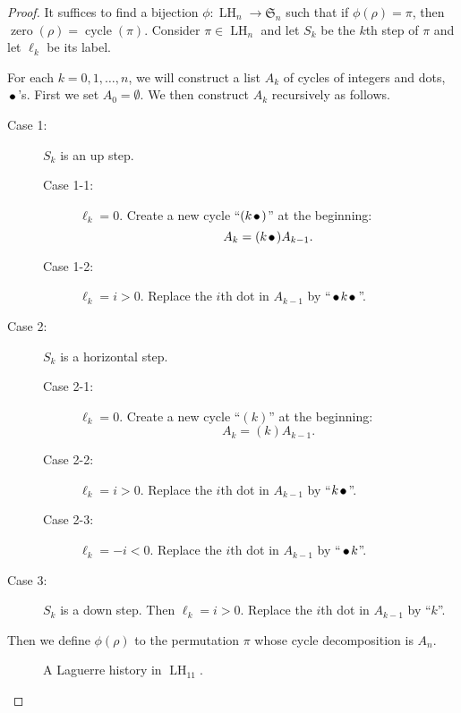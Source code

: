 \documentclass[oneside]{book}
\numberwithin{equation}{section}
\theoremstyle{definition}
\newcommand\zero{\operatorname{zero}}
\newcommand\LH{\operatorname{LH}}
\newcommand\cycle{\operatorname{cycle}}
\newcommand\sym{\mathfrak{S}}
\def\fcirc{\,\tikz\draw[fill] (0,0) circle (2pt);\,}
\begin{document}
\begin{proof}
  It suffices to find a bijection \( \phi:\LH_n\to \sym_n \) such that
  if \( \phi(\rho)=\pi \), then 
  \( \zero(\rho) = \cycle(\pi) \). Consider
  \( \pi \in \LH_n \) and let \( S_k \) be the \( k \)th step of
  \( \pi \) and let \( \ell_k \) be its label.

For each \( k= 0,1,\dots,n \), we will construct a list \( A_k \) of
cycles of integers and dots, \( \fcirc \)'s. First we set
\( A_0 = \emptyset \). We then construct \( A_{k} \) recursively as follows.
\begin{description}
\item[Case 1:] \( S_k \) is an up step.
  \begin{description}
  \item[Case 1-1:] \( \ell_k=0 \). Create a new
  cycle ``\( (k\fcirc) \)'' at the beginning:
  \[
    A_k = (k\fcirc) A_{k-1}.
  \]
\item[Case 1-2:] \( \ell_k=i>0 \). Replace the
  \( i \)th dot in \( A_{k-1} \) by ``\( \fcirc k \fcirc \)''.
  \end{description}
\item[Case 2:] \( S_k \) is a horizontal step.
  \begin{description}
  \item[Case 2-1:] \( \ell_k=0 \). Create a new cycle ``\( (k) \)'' at the
    beginning:
  \[
    A_k = (k) A_{k-1}.
  \]
\item[Case 2-2:] \( \ell_k=i>0 \). Replace the \( i \)th dot in
  \( A_{k-1} \) by ``\( k \fcirc \)''.
\item[Case 2-3:] \( \ell_k=-i<0 \). Replace the \( i \)th dot in
  \( A_{k-1} \) by ``\( \fcirc k \)''.
  \end{description}

\item[Case 3:] \( S_k \) is a down step. Then \( \ell_k=i>0 \).
  Replace the \( i \)th dot in \( A_{k-1} \) by ``\( k \)''.
\end{description}
Then we define \( \phi(\rho) \)
to the permutation \( \pi \) whose cycle decomposition
is \( A_n \).

\begin{figure}
  \centering
  \caption{A Laguerre history in \( \LH_{11} \).}
  \label{fig:Lag-his}
\end{figure}


\end{proof}
\end{document}

